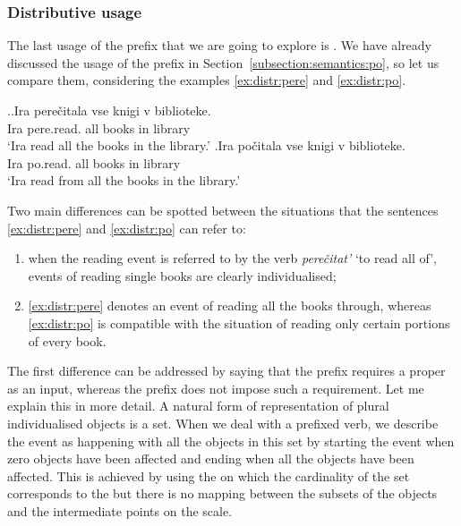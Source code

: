 \subsubsection{Distributive usage}
The last usage of the prefix  that we are going to explore is . We have already discussed the  usage of the prefix  in Section~\ref{subsection:semantics:po}, so let us compare them, considering the examples \ref{ex:distr:pere} and \ref{ex:distr:po}.

\ex.\ag.\label{ex:distr:pere}Ira pere\v{c}itala vse knigi v biblioteke.\\
Ira pere.read. all books in library\\
\trans `Ira read all the books in the library.'
\bg.\label{ex:distr:po}Ira po\v{c}itala vse knigi v biblioteke.\\
Ira po.read. all books in library\\
\trans `Ira read from all the books in the library.'

Two main differences can be spotted between the situations that the sentences \ref{ex:distr:pere} and \ref{ex:distr:po} can refer to:
\begin{enumerate}
\item when the reading event is referred to by the verb \textit{pere\v{c}itat'} `to read all of', events of reading single books are clearly individualised;
\item \ref{ex:distr:pere} denotes an event of reading all the books through, whereas \ref{ex:distr:po} is compatible with the situation of reading only certain portions of every book.
\end{enumerate}

The first difference can be addressed by saying that the prefix  requires a proper  as an input, whereas the prefix  does not impose such a requirement. Let me explain this in more detail. A natural form of representation of plural individualised objects is a set. When we deal with a prefixed verb, we describe the event as happening with all the objects in this set by starting the event when zero objects have been affected and ending when all the objects have been affected. This is achieved by using the  on which the cardinality of the set corresponds to the  but there is no mapping between the subsets of the objects and the intermediate points on the scale.

